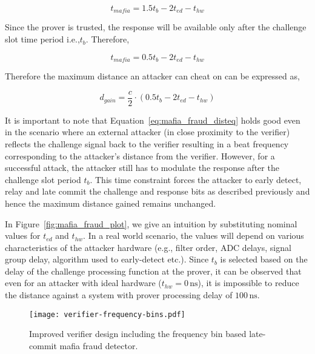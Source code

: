 \documentclass{sig-alternate-10pt}
\makeatletter
\newcommand{\eg}{e.g.,\xspace}
\newcommand{\etc}{etc.\@\xspace}
\newcommand{\ie}{i.e.,\xspace}
\newcommand{\unit}[1]{\ensuremath{\, \mathrm{#1}}}
\makeatother
\begin{document}
\begin{equation}
  \label{eq:mafia_fraud_wo_proverdelay}
  t_{mafia} = 1.5t_b - 2t_{ed} - t_{hw}
\end{equation}

Since the prover is trusted, the response will be available only after the
challenge slot time period \ie $t_b$. Therefore,

\begin{equation}
  \label{eq:mafia_fraud_final}
  t_{mafia} = 0.5t_b - 2t_{ed} - t_{hw}
\end{equation}

Therefore the maximum distance an attacker can cheat on can be expressed as,

\begin{equation}
  \label{eq:mafia_fraud_disteq}
  d_{gain}= \frac{c}{2} \cdot (0.5t_b - 2t_{ed} - t_{hw})
\end{equation}

It is important to note that Equation~\eqref{eq:mafia_fraud_disteq} holds good
even in the scenario where an external attacker (in close proximity to the
verifier) reflects the challenge signal back to the verifier resulting in a beat
frequency corresponding to the attacker's distance from the verifier. However,
for a successful attack, the attacker still has to modulate the response after
the challenge slot period $t_b$. This time constraint forces the attacker to
early detect, relay and late commit the challenge and response bits as described
previously and hence the maximum distance gained remains unchanged.

In Figure~\ref{fig:mafia_fraud_plot}, we give an intuition by substituting
nominal values for $t_{ed}$ and $t_{hw}$. In a real world scenario, the values
will depend on various characteristics of the attacker hardware (\eg filter
order, ADC delays, signal group delay, algorithm used to early-detect \etc).
Since $t_b$ is selected based on the delay of the challenge processing
function at the prover, it can be observed that even for an attacker with
ideal hardware ($t_{hw}=0\unit{ns}$), it is impossible to reduce the distance
against a system with prover processing delay of $100\unit{ns}$. 

\begin{figure}[t]
  \centering
  \texttt{[image: verifier-frequency-bins.pdf]}
  \caption{Improved verifier design including the frequency bin based
    late-commit mafia fraud detector.}
  \label{fig:verifier-bins}
\end{figure}
\end{document}
